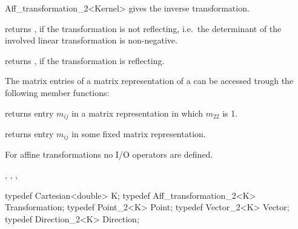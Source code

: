 \begin{ccRefClass}{Aff_transformation_2<Kernel>}
       {gives the inverse transformation.}


       {returns , if the transformation is not reflecting,
        i.e.\ the determinant of the involved linear transformation is
        non-negative.}

       {returns , if the transformation is reflecting.}



The matrix entries of a matrix representation of a 
can be accessed trough the following member functions:

                      {}
\ccGlue
{}
       {returns entry $m_{ij}$ in a matrix representation in which $m_{22}$ is 1.}

                      {}
\ccGlue
{}
       {returns entry $m_{ij}$ in some fixed matrix representation.} 


For affine transformations  no I/O operators are defined.

%

\ccSeeAlso
{}, 
, 
,
 \\

\ccExample

\begin{cprog}
  typedef Cartesian<double>        K;
  typedef Aff_transformation_2<K>  Transformation;
  typedef Point_2<K>               Point;
  typedef Vector_2<K>              Vector;
  typedef Direction_2<K>           Direction;


\end{cprog}
\end{ccRefClass}
